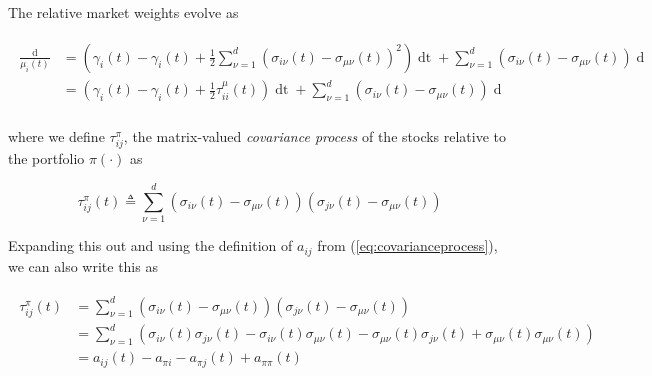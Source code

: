 \documentclass[british]{amsart} \usepackage{lmodern}
\numberwithin{equation}{section} \numberwithin{figure}{section}
\theoremstyle{plain} \newtheorem{thm}{\protect\theoremname}[section]
\theoremstyle{definition} \newtheorem{defn}[thm]{\protect\definitionname}
\theoremstyle{plain} \newtheorem{assumption}[thm]{\protect\assumptionname}
\theoremstyle{plain} \newtheorem{lem}[thm]{\protect\lemmaname}
\theoremstyle{plain} \newtheorem{prop}[thm]{\protect\propositionname}
\theoremstyle{remark} \newtheorem{rem}[thm]{\protect\remarkname}
\theoremstyle{plain} \newtheorem{cor}[thm]{\protect\corollaryname}
\renewcommand{\d}[1]{\mathop{\mathrm{d}{#1}}}
\newcommand{\defeq}{\mathop{\triangleq}} \newcommand{\almostsurely}{\text{a.s.}}
\begin{document}
The relative market weights evolve as

  \begin{gather} 
    \label{eq:relativemarketweights}
    \begin{split} 
      \frac{\d{\mu_{i}(t)}}{\mu_{i}(t)} &=
        \left(
         \gamma_{i}(t) - \gamma_{i}(t) + \frac{1}{2} 
            \sum_{\nu=1}^{d}
            \left(
              \sigma_{i\nu}(t) - \sigma_{\mu\nu}(t)
            \right) ^ 2
        \right) \d{t} + 
        \sum_{\nu=1}^{d}
        \left(
          \sigma_{i\nu}(t) - \sigma_{\mu\nu}(t)
        \right) \d{W_{\nu}(t)}  \\
        &=
        \left(
         \gamma_{i}(t) - \gamma_{i}(t) + \frac{1}{2} \tau_{ii}^{\mu}(t)
        \right) \d{t} + 
        \sum_{\nu=1}^{d}
        \left(
          \sigma_{i\nu}(t) - \sigma_{\mu\nu}(t)
        \right) \d{W_{\nu}(t)}  \\
    \end{split}
  \end{gather}

where we define $\tau_{ij}^{\pi}$, the matrix-valued \textit{covariance process}
of the stocks relative to the portfolio $\pi(\cdot)$ as

\begin{equation}
  \label{eq:deftau}
  \tau_{ij}^{\pi}(t) \defeq
            \sum_{\nu=1}^{d}
            \left(
              \sigma_{i\nu}(t) - \sigma_{\mu\nu}(t)
            \right) 
            \left(
              \sigma_{j\nu}(t) - \sigma_{\mu\nu}(t)
            \right) 
\end{equation}

Expanding this out and using the definition of $a_{ij}$
from (\ref{eq:covarianceprocess}), we can also write this as

  \begin{gather}
    \begin{split}
      \tau_{ij}^{\pi}(t) 
        &=
            \sum_{\nu=1}^{d}
            \left(
              \sigma_{i\nu}(t) - \sigma_{\mu\nu}(t)
            \right) 
            \left(
              \sigma_{j\nu}(t) - \sigma_{\mu\nu}(t)
            \right) \\
        &=
            \sum_{\nu=1}^{d}
            \left(
              \sigma_{i\nu}(t)\sigma_{j\nu}(t) - \sigma_{i\nu}(t)\sigma_{\mu\nu}(t) -
              \sigma_{\mu\nu}(t)\sigma_{j\nu}(t) + \sigma_{\mu\nu}(t)\sigma_{\mu\nu}(t)
            \right) \\
        &= a_{ij}(t) - a_{\pi i} - a_{\pi j}(t) + a_{\pi\pi}(t)
   \end{split}
  \end{gather}
\end{document}
